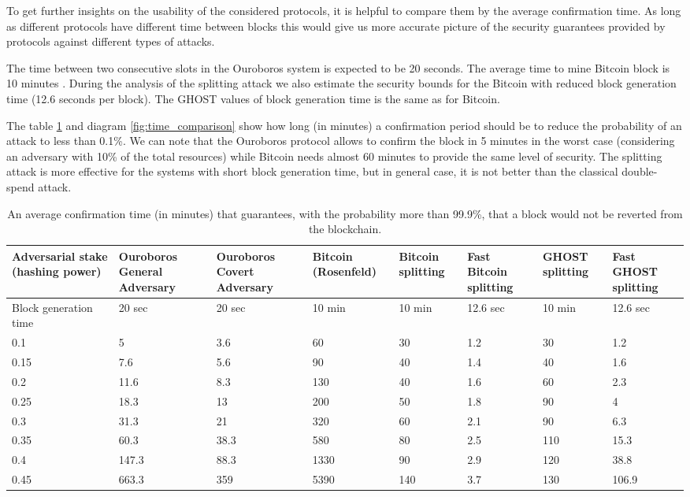 \documentclass[10pt,a4paper]{article}
\numberwithin{equation}{section} %
\theoremstyle{plain}
\theoremstyle{definition}
\theoremstyle{remark}
\begin{document}
    To get further insights on the usability of the considered protocols, it is helpful to compare them by the average confirmation time. As long as different protocols have different time between blocks this would give us more accurate picture of the security guarantees provided by protocols against different types of attacks.
    
    The time between two consecutive slots in the Ouroboros system is expected to be 20 seconds. The average time to mine Bitcoin block is 10 minutes \cite{N08}. During the analysis of the splitting attack we also estimate the security bounds for the Bitcoin with reduced block generation time (12.6 seconds per block). The GHOST values of block generation time is the same as for Bitcoin.
    
    The table \ref{tbl:time_comparison} and diagram \ref{fig:time_comparison} show how long (in minutes) a confirmation period should be to reduce the probability of an attack to less than 0.1\%. We can note that the Ouroboros protocol allows to confirm the block in 5 minutes in the worst case (considering an adversary with 10\% of the total resources) while Bitcoin needs almost 60 minutes to provide the same level of security. The splitting attack is more effective for the systems with short block generation time, but in general case, it is not better than the classical double-spend attack.
    \begin{table}[h!]
        \label{tbl:time_comparison}
        \centering
        \begin{tabular}{|p{2cm}||p{1.5cm}|p{1.5cm}|p{1.2cm}|p{1.2cm}|p{1.5cm}|p{1.2cm}|p{1.2cm}|}
             \hline 
             Adversarial stake (hashing power) & Ouroboros General Adversary & Ouroboros Covert Adversary & Bitcoin (Rosenfeld) & Bitcoin splitting & Fast Bitcoin splitting & GHOST splitting & Fast GHOST splitting \\
             \hline
             Block generation time & 20 sec & 20 sec & 10 min & 10 min & 12.6 sec & 10 min & 12.6 sec \\
             \hline
             0.1   & 5     & 3.6  & 60   & 30  & 1.2 & 30   & 1.2    \\
             0.15  & 7.6   & 5.6  & 90   & 40  & 1.4 & 40   & 1.6    \\
             0.2   & 11.6  & 8.3  & 130  & 40  & 1.6 & 60   & 2.3    \\
             0.25  & 18.3  & 13   & 200  & 50  & 1.8 & 90   & 4      \\
             0.3   & 31.3  & 21   & 320  & 60  & 2.1 & 90   & 6.3    \\
             0.35  & 60.3  & 38.3 & 580  & 80  & 2.5 & 110  & 15.3   \\
             0.4   & 147.3 & 88.3 & 1330 & 90  & 2.9 & 120  & 38.8   \\
             0.45  & 663.3 & 359  & 5390 & 140 & 3.7 & 130  & 106.9  \\
             \hline
        \end{tabular}
        \caption{An average confirmation time (in minutes) that guarantees, with the probability more than 99.9\%, that a block would not be reverted from the blockchain.}
    \end{table}
\end{document}
